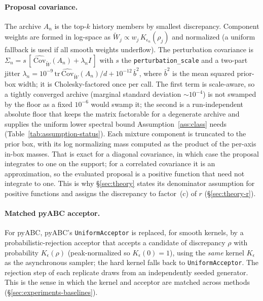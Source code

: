 \documentclass[10pt]{article}
\theoremstyle{plain}
\theoremstyle{definition}
\begin{document}
\paragraph{Proposal covariance.} The archive $A_n$ is the top-$k$ history members by smallest discrepancy. Component weights are formed in log-space as $\tilde W_j \propto w_j\,K_{\epsilon_n}(\rho_j)$ and normalized (a uniform fallback is used if all smooth weights underflow). The perturbation covariance is $\Sigma_n = s\,[\,\widehat{\mathrm{Cov}}_{\tilde W}(A_n) + \lambda_n I\,]$ with $s$ the \texttt{perturbation\_scale} and a two-part jitter $\lambda_n = 10^{-9}\,\mathrm{tr}\,\widehat{\mathrm{Cov}}_{\tilde W}(A_n)/d + 10^{-12}\,\bar b^2$, where $\bar b^2$ is the mean squared prior-box width; it is Cholesky-factored once per call. The first term is scale-aware, so a tightly converged archive (marginal standard deviation ${\sim}10^{-4}$) is not swamped by the floor as a fixed $10^{-6}$ would swamp it; the second is a run-independent absolute floor that keeps the matrix factorable for a degenerate archive and supplies the uniform lower spectral bound Assumption~\ref{ass:class} needs (Table~\ref{tab:assumption-status}). Each mixture component is truncated to the prior box, with its log normalizing mass computed as the product of the per-axis in-box masses. That is exact for a diagonal covariance, in which case the proposal integrates to one on the support; for a correlated covariance it is an approximation, so the evaluated proposal is a positive function that need not integrate to one. This is why \S\ref{sec:theory} states its denominator assumption for positive functions and assigns the discrepancy to factor~(c) of $r$ (\S\ref{sec:theory-r}).

\paragraph{Matched pyABC acceptor.} For pyABC, pyABC's \texttt{UniformAcceptor} is replaced, for smooth kernels, by a probabilistic-rejection acceptor that accepts a candidate of discrepancy $\rho$ with probability $K_{\epsilon}(\rho)$ (peak-normalized so $K_{\epsilon}(0)=1$), using the \emph{same} kernel $K_{\epsilon}$ as the asynchronous sampler; the hard kernel falls back to \texttt{UniformAcceptor}. The rejection step of each replicate draws from an independently seeded generator. This is the sense in which the kernel and acceptor are matched across methods (\S\ref{sec:experiments-baselines}).
\end{document}
